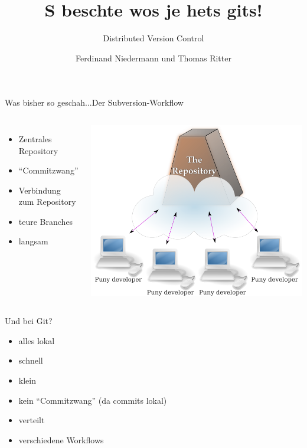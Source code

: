 \documentclass[12pt,a4paper]{beamer}
\author{Ferdinand Niedermann und Thomas Ritter}
\title{S beschte wos je hets \textbf{git}s!}
\subtitle{Distributed Version Control}
\begin{document}
\maketitle

\begin{frame}{Was bisher so geschah...}{Der Subversion-Workflow}
  \begin{columns}
	  \begin{itemize}
    	\item Zentrales Repository
    \item ``Commitzwang''
    \item Verbindung zum Repository
    \item teure Branches
    \item langsam
  \end{itemize}
	  \includegraphics[width=1\textwidth]{./images/holy-repo.png}	  	
  \end{columns}
\end{frame}

\begin{frame}[<+->]{Und bei Git?}{}
  \begin{itemize}
    \item alles lokal
    \item schnell
    \item klein
    \item kein ``Commitzwang'' (da commits lokal)
    \item verteilt
    \item verschiedene Workflows
  \end{itemize}
\end{frame}
\end{document}

